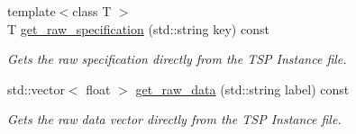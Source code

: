 \begin{DoxyCompactItemize}
{\footnotesize template$<$class T $>$ }\\T \hyperlink{classas_1_1tsplib_1_1TSPInstance_a24f6eeee5dba6517265a9211da0b4962}{get\+\_\+raw\+\_\+specification} (std\+::string key) const
\begin{DoxyCompactList}\small\item\em Gets the raw specification directly from the T\+SP Instance file. \end{DoxyCompactList}\item 
std\+::vector$<$ float $>$ \hyperlink{classas_1_1tsplib_1_1TSPInstance_abba8d53e1d420920fd316f884ce2f10d}{get\+\_\+raw\+\_\+data} (std\+::string label) const
\begin{DoxyCompactList}\small\item\em Gets the raw data vector directly from the T\+SP Instance file. \end{DoxyCompactList}\end{DoxyCompactItemize}

